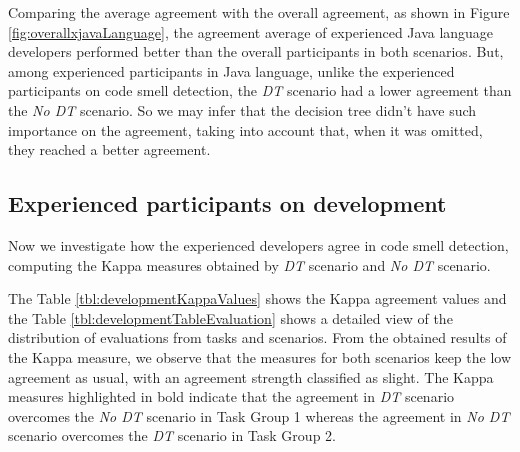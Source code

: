 Comparing the average agreement with the overall agreement, as shown in Figure \ref{fig:overallxjavaLanguage}, the agreement average of experienced Java language developers performed better than the overall participants in both scenarios. But, among experienced participants in Java language, unlike the experienced participants on code smell detection, the \textit{DT} scenario had a lower agreement than the \textit{No DT} scenario. So we may infer that the decision tree didn't have such importance on the agreement, taking into account that, when it was omitted, they reached a better agreement.

\subsection{Experienced participants on development} \label{sec:participantsDevelopmentAgreement}    
Now we investigate how the experienced developers agree in code smell detection, computing the Kappa measures obtained by \textit{DT} scenario and \textit{No DT} scenario.

The Table \ref{tbl:developmentKappaValues} shows the Kappa agreement values and the Table \ref{tbl:developmentTableEvaluation} shows a detailed view of the distribution of evaluations from tasks and scenarios. From the obtained results of the Kappa measure, we observe that the measures for both scenarios keep the low agreement as usual, with an agreement strength classified as slight.
The Kappa measures highlighted in bold indicate that the agreement in \textit{DT} scenario overcomes the \textit{No DT} scenario in Task Group 1 whereas the agreement in \textit{No DT} scenario overcomes the \textit{DT} scenario in Task Group 2. %

